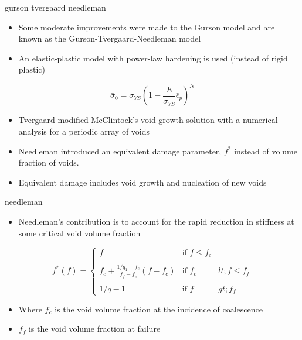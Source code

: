\documentclass[
  letterpaper,
  ignorenonframetext,
  aspectratio=43,
  handout,
  12pt]{beamer}
\providecommand{\tightlist}{%
  \setlength{\itemsep}{0pt}\setlength{\parskip}{0pt}}
\providecommand{\tightlist}{%
\setlength{\itemsep}{0pt}\setlength{\parskip}{0pt}}
\begin{document}
\begin{frame}{gurson tvergaard needleman}
\protect\hypertarget{gurson-tvergaard-needleman}{}
\begin{itemize}
\tightlist
\item
  Some moderate improvements were made to the Gurson model and are known
  as the Gurson-Tvergaard-Needleman model
\item
  An elastic-plastic model with power-law hardening is used (instead of
  rigid plastic)
\end{itemize}

\[\bar{\sigma}_0 = \sigma_{YS} \left( 1-\frac{E}{\sigma_{YS}}\bar{\epsilon}_p\right)^N\]

\begin{itemize}
\tightlist
\item
  Tvergaard modified McClintock's void growth solution with a numerical
  analysis for a periodic array of voids
\item
  Needleman introduced an equivalent damage parameter, \(f^*\) instead
  of volume fraction of voids.
\item
  Equivalent damage includes void growth and nucleation of new voids
\end{itemize}
\end{frame}

\begin{frame}{needleman}
\protect\hypertarget{needleman}{}
\begin{itemize}
\tightlist
\item
  Needleman's contribution is to account for the rapid reduction in
  stiffness at some critical void volume fraction
\end{itemize}

\[f^*(f) = \begin{cases}
  f & \text{if } f \le f_c\\\\
  f_c + \frac{1/q_1-f_c}{f_f-f_c}(f-f_c) & \text{if } f_c &lt; f \le f_f \\\\
  1/q-1 & \text{if } f &gt; f_f
\end{cases}\]

\begin{itemize}
\tightlist
\item
  Where \(f_c\) is the void volume fraction at the incidence of
  coalescence
\item
  \(f_f\) is the void volume fraction at failure
\end{itemize}
\end{frame}
\end{document}
